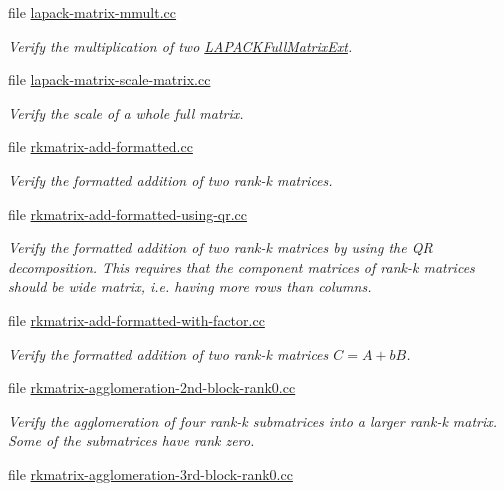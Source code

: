 \begin{DoxyCompactItemize}
file \hyperlink{lapack-matrix-mmult_8cc}{lapack-\/matrix-\/mmult.\+cc}
\begin{DoxyCompactList}\small\item\em Verify the multiplication of two {\ttfamily \hyperlink{classLAPACKFullMatrixExt}{L\+A\+P\+A\+C\+K\+Full\+Matrix\+Ext}}. \end{DoxyCompactList}\item 
file \hyperlink{lapack-matrix-scale-matrix_8cc}{lapack-\/matrix-\/scale-\/matrix.\+cc}
\begin{DoxyCompactList}\small\item\em Verify the scale of a whole full matrix. \end{DoxyCompactList}\item 
file \hyperlink{rkmatrix-add-formatted_8cc}{rkmatrix-\/add-\/formatted.\+cc}
\begin{DoxyCompactList}\small\item\em Verify the formatted addition of two rank-\/k matrices. \end{DoxyCompactList}\item 
file \hyperlink{rkmatrix-add-formatted-using-qr_8cc}{rkmatrix-\/add-\/formatted-\/using-\/qr.\+cc}
\begin{DoxyCompactList}\small\item\em Verify the formatted addition of two rank-\/k matrices by using the QR decomposition. This requires that the component matrices of rank-\/k matrices should be wide matrix, i.\+e. having more rows than columns. \end{DoxyCompactList}\item 
file \hyperlink{rkmatrix-add-formatted-with-factor_8cc}{rkmatrix-\/add-\/formatted-\/with-\/factor.\+cc}
\begin{DoxyCompactList}\small\item\em Verify the formatted addition of two rank-\/k matrices $C = A + b B$. \end{DoxyCompactList}\item 
file \hyperlink{rkmatrix-agglomeration-2nd-block-rank0_8cc}{rkmatrix-\/agglomeration-\/2nd-\/block-\/rank0.\+cc}
\begin{DoxyCompactList}\small\item\em Verify the agglomeration of four rank-\/k submatrices into a larger rank-\/k matrix. Some of the submatrices have rank zero. \end{DoxyCompactList}\item 
file \hyperlink{rkmatrix-agglomeration-3rd-block-rank0_8cc}{rkmatrix-\/agglomeration-\/3rd-\/block-\/rank0.\+cc}

\end{DoxyCompactItemize}
